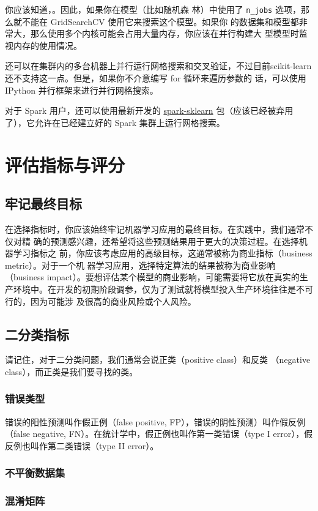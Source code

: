 你应该知道，。因此，如果你在模型（比如随机森
林）中使用了 \verb|n_jobs| 选项，那么就不能在 GridSearchCV 使用它来搜索这个模型。如果你
的数据集和模型都非常大，那么使用多个内核可能会占用大量内存，你应该在并行构建大
型模型时监视内存的使用情况。

还可以在集群内的多台机器上并行运行网格搜索和交叉验证，不过目前scikit-learn 还不支持这一点。但是，如果你不介意编写 for 循环来遍历参数的
话，可以使用 IPython 并行框架来进行并行网格搜索。

对于 Spark 用户，还可以使用最新开发的 \href{https://github.com/databricks/spark-sklearn}{spark-sklearn} 包（应该已经被弃用了），它允许在已经建立好的 Spark 集群上运行网格搜索。
\section{评估指标与评分}
\subsection{牢记最终目标}
在选择指标时，你应该始终牢记机器学习应用的最终目标。在实践中，我们通常不仅对精
确的预测感兴趣，还希望将这些预测结果用于更大的决策过程。在选择机器学习指标之
前，你应该考虑应用的高级目标，这通常被称为商业指标（business metric）。对于一个机
器学习应用，选择特定算法的结果被称为商业影响（business impact）。要想评估某个模型的商业影响，可能需要将它放在真实的生产环境中。在开发的初期阶段调参，仅为了测试就将模型投入生产环境往往是不可行的，因为可能涉
及很高的商业风险或个人风险。
\subsection{二分类指标}
请记住，对于二分类问题，我们通常会说正类（positive class）和反类
（negative class），而正类是我们要寻找的类。
\subsubsection{错误类型}
错误的阳性预测叫作假正例（false positive, FP），错误的阴性预测）叫作假反例（false negative, FN）。在统计学中，假正例也叫作第一类错误（type I
error），假反例也叫作第二类错误（type II error）。
\subsubsection{不平衡数据集}
\subsubsection{混淆矩阵}
